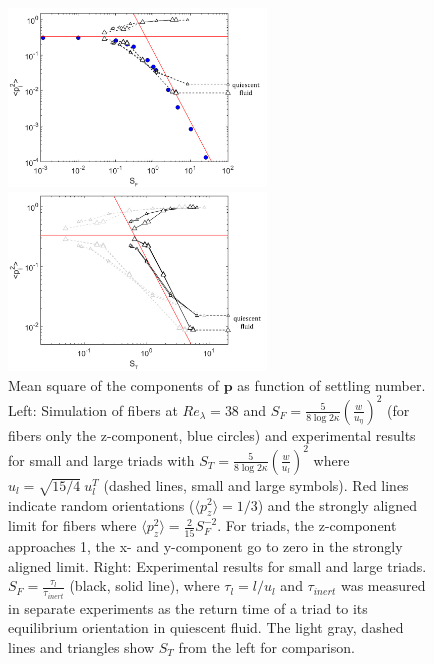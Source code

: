 \documentclass[]{jfm}
\begin{document}
\begin{figure}
\centering
\begin{minipage}{.5\textwidth}
  \centering
  \includegraphics[width=2.7in]{figures/SF_theory.pdf}
\end{minipage}%
\begin{minipage}{.5\textwidth}
  \centering
  \includegraphics[width=2.7in]{figures/SF_experiments.pdf}
\end{minipage}
  \caption{Mean square of the components of $\mathbf{p}$ as function of settling number. Left: Simulation of fibers at $\textit{Re}_{\lambda}{=}38$ and $S_F{=}\frac{5}{8\log{2\kappa}}(\frac{w}{u_{\eta}})^2$ (for fibers only the z-component, blue circles) and experimental results for small and large triads with $S_T{=}\frac{5}{8\log{2\kappa}}(\frac{w}{u_{l}})^2$ where $u_l{=}\sqrt{15/4}~u_l^T$ (dashed lines, small and large symbols).  Red lines indicate random orientations ($\langle p_z^2\rangle=1/3$) and the strongly aligned limit for fibers where $\langle p_z^2\rangle=\frac{2}{15}S_F^{-2}$.  For triads, the z-component approaches 1, the x- and y-component go to zero in the strongly aligned limit.  Right: Experimental results for small and large triads.  $S_F{=}\frac{\tau_l}{\tau_{\textit{inert}}}$ (black, solid line), where $\tau_l{=}l/u_l$ and $\tau_{\textit{inert}}$ was measured in separate experiments as the return time of a triad to its equilibrium orientation in quiescent fluid. The light gray, dashed lines and triangles show $S_T$ from the left for comparison.}
\label{Fig:mean-square}
\end{figure}
\end{document}
